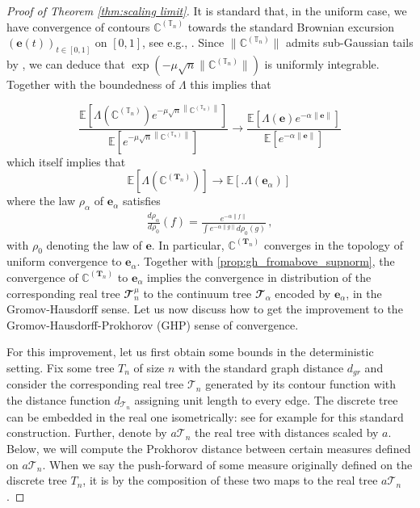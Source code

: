 \documentclass{article}
\newcommand{\ccT}{\mathbfcal{T}}
\newcommand{\E}{\mathbb{E}}								%
\newcommand{\Exp}[1]{\E\left[#1\right]}					%
\newcommand{\1}{\mathbbm{1}}								%
\theoremstyle{definition}
\numberwithin{equation}{section}
\newcommand{\bT}{\mathbf T}
\newcommand{\cT}{\mathcal T}
\newcommand{\T}{\mathbb T}
\newcommand{\C}{\mathbb C}
\begin{document}
\begin{proof}[Proof of Theorem \ref{thm:scaling limit}]
It is standard that, in the uniform case, we have convergence of contours $\C^{(\T_n)}$ towards the standard Brownian excursion $(\mathbf{e}(t))_{t \in [0,1]}$ on $[0,1]$, see e.g., \cite{aldous1991continuum}. Since $\| \C^{(\T_n)} \|$ admits sub-Gaussian tails by \cite[Theorem 1.2]{LAB_LD_SJ_13}, we can deduce that  $\exp(-\mu \sqrt{n} \| \C^{(\T_n)}\|)$ is uniformly integrable.
Together with the boundedness of $\Lambda$ this implies that

$$
\frac{\E\left[\Lambda(\C^{(\T_n)}) e^{-\mu \sqrt{n} \left\| \C^{(\T_n)}\right\|}  \right]}{\Exp{e^{-\mu \sqrt{n} \left\| \C^{(\T_n)}\right\|} }} \longrightarrow \frac{\E \left[ \Lambda (\mathbf{e}) e^{-\alpha \|\mathbf{e}\|}\right]}{\Exp{e^{-\alpha \|\mathbf{e}\|}}}
$$
which itself implies that
$$
\E\left[\Lambda\left(\C^{(\bT_n)}\right) \right]\longrightarrow \Exp{\big.\Lambda(\mathbf{e}_{\alpha})} \, 
$$
where the law $\rho_\alpha$ of $\mathbf{e}_\alpha$ satisfies     
\begin{align*}
 \frac{d\rho_{\alpha}}{d\rho_{0}}(f)=\frac{e^{-\alpha \|f\|}}{\int e^{-\alpha \| g \| }d\rho_0 (g)} \, ,
 \end{align*}
{with $\rho_0$ denoting the law of $\mathbf{e}$. In particular, $\C^{(\bT_n)}$ converges in the topology of uniform convergence to $\mathbf{e}_\alpha$. Together with \cref{prop:gh_fromabove_supnorm}, the convergence of $\C^{(\bT_n)}$ to $\mathbf{e}_\alpha$  implies the convergence in distribution of the corresponding real tree $\ccT^\mu _n$ to the continuum tree $\ccT_\alpha$ encoded by $\mathbf{e}_\alpha$, in the Gromov-Hausdorff sense. Let us now discuss how to get the improvement to the Gromov-Hausdorff-Prokhorov (GHP) sense of convergence.}

For this improvement, let us first obtain some bounds in the deterministic setting. Fix some tree $T_n$ of size $n$ with the standard graph distance $d_{gr}$ and consider the corresponding real tree $\cT_n$ generated by its contour function with the distance function $d_{\cT_n}$ assigning unit length to every edge. The discrete tree can be embedded in the real one isometrically: see for example \cite[Example 4.9]{duquesne2022scaling} for this standard construction. Further, denote by $a\cT_n$ the real tree with distances scaled by $a$. Below, we will compute the Prokhorov distance between certain measures defined on $a\cT_n$. When we say the push-forward of some measure originally defined on the discrete tree $T_n$, it is by the composition of these two maps to the real tree $a\cT_n$.


\end{proof}
\end{document}
